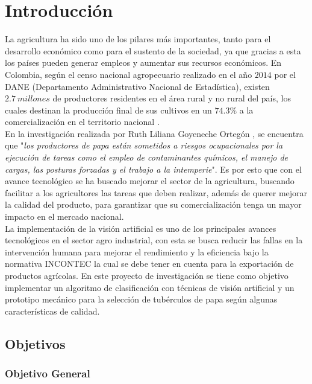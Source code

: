 \cleardoublepage %

\chapter{Introducción}

La agricultura ha sido uno de los pilares más importantes, tanto para el desarrollo económico como para el sustento de la sociedad, ya que gracias a esta los países pueden generar empleos y aumentar sus recursos económicos. En Colombia, según el censo nacional agropecuario realizado en el año $2014$ por el DANE (Departamento Administrativo Nacional de Estadística), existen $2.7 \ millones$ de productores residentes en el área rural y no rural del país, los cuales destinan la producción final de sus cultivos en un $74.3 \%$ a la comercialización en el territorio nacional \cite{Dane2016}.\\

En la investigación realizada por Ruth Liliana Goyeneche Ortegón \cite{goyeneche2015miradas}, se encuentra que "\textit{los productores de papa están sometidos a riesgos ocupacionales por la ejecución de tareas como el empleo de contaminantes químicos, el manejo de cargas, las posturas forzadas y el trabajo a la intemperie}". Es por esto que con el avance tecnológico se ha buscado mejorar el sector de la agricultura, buscando facilitar a los agricultores las tareas que deben realizar, además de querer mejorar la calidad del producto, para garantizar que su comercialización tenga un mayor impacto en el mercado nacional.\\

La implementación de la visión artificial es uno de los principales avances tecnológicos en el sector agro industrial, con esta se busca reducir las fallas en la intervención humana para mejorar el rendimiento y la eficiencia bajo la normativa INCONTEC la cual se debe tener en cuenta para la exportación de productos agrícolas. En este proyecto de investigación se tiene como objetivo implementar un algoritmo de clasificación con técnicas de visión artificial y un prototipo mecánico para la selección de tubérculos de papa según algunas características de calidad.



\newpage
\section{Objetivos}

\subsection{Objetivo General}

